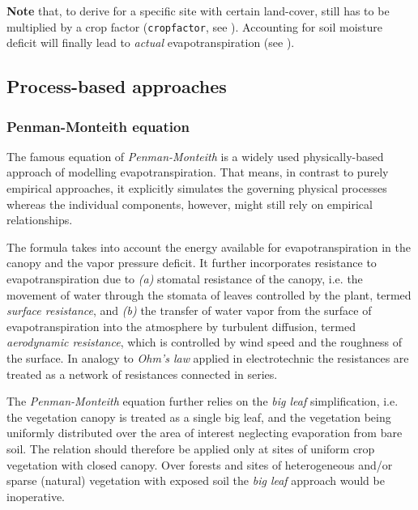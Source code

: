 \textbf{Note} that, to derive \etPot{} for a specific site with certain land-cover,  still has to be multiplied by a crop factor (\verb!cropfactor!, see ). Accounting for soil moisture deficit will finally lead to \emph{actual} evapotranspiration \etReal{} (see ).




\subsection{Process-based approaches}\label{sec:et:proc}

\subsubsection{Penman-Monteith equation} \label{sec:et:penmon}

The famous equation of \emph{Penman-Monteith} is a widely used physically-based approach of modelling evapotranspiration. That means, in contrast to purely empirical approaches, it explicitly simulates the governing physical processes whereas the individual components, however, might still rely on empirical relationships. 

The formula takes into account the energy available for evapotranspiration in the canopy and the vapor pressure deficit. It further incorporates resistance to evapotranspiration due to \emph{(a)} stomatal resistance of the canopy, i.e. the movement of water through the stomata of leaves controlled by the plant, termed \emph{surface resistance}, and \emph{(b)} the transfer of water vapor from the surface of evapotranspiration into the atmosphere by turbulent diffusion, termed \emph{aerodynamic resistance}, which is controlled by wind speed and the roughness of the surface. In analogy to \emph{Ohm's law} applied in electrotechnic the resistances are treated as a network of resistances connected in series.

The \emph{Penman-Monteith} equation further relies on the \emph{big leaf} simplification, i.e. the vegetation canopy is treated as a single big leaf, and the vegetation being uniformly distributed over the area of interest neglecting evaporation from bare soil. The relation should therefore be applied only at sites of uniform crop vegetation with closed canopy. Over forests and sites of heterogeneous and/or sparse (natural) vegetation with exposed soil the \emph{big leaf} approach would be inoperative.

